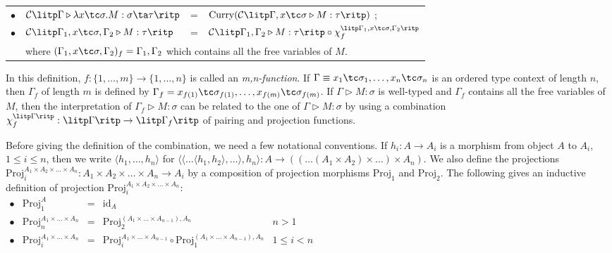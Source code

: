 \begin{definition}
\begin{myitemize}
\begin{tabular}{rlcl}
  $ \bullet $ & $ \mathcal{C} \litp \Gamma \triangleright \lambda x \tc \sigma .M: \sigma \ta \tau \ritp $ & = & $ \text{Curry}( \mathcal{C} \litp \Gamma , x \tc \sigma \triangleright M: \tau \ritp ) $ ; \\[5pt]
  $ \bullet $ & $ \mathcal{C} \litp \Gamma _1 , x \tc \sigma , \Gamma _2 \triangleright M: \tau \ritp $ & = & $ \mathcal{C} \litp \Gamma _1 , \Gamma _2 \triangleright M: \tau \ritp \circ \chi_f^{\litp \Gamma _1 , x \tc \sigma , \Gamma _2 \ritp} $ \\[5pt]
  & \multicolumn{3}{l}{where $ ( \Gamma _1 , x \tc \sigma , \Gamma _2 )_f = \Gamma _1 , \Gamma _2 $ which contains all the free variables of $ M $.} \\[5pt]
  \end{tabular}
\end{myitemize}
\end{definition}

In this definition, $ f: \{ 1, \ldots , m \} \to \{ 1, \ldots , n \} $ is called an \emph{m,n-function}. If $ \Gamma \equiv x_1 \tc \sigma_1, \ldots , x_n \tc \sigma_n $ is an ordered type context of length $ n $, then $ \Gamma_f $ of length $ m $ is defined by $ \Gamma_f = x_{f(1)} \tc \sigma_{f(1)}, \ldots , x_{f(m)} \tc \sigma_{f(m)} $. If $ \Gamma \triangleright M: \sigma $ is well-typed and $ \Gamma_f $ contains all the free variables of $ M $, then the interpretation of $ \Gamma_f \triangleright M: \sigma $ can be related to the one of $ \Gamma \triangleright M: \sigma $ by using a combination $ \chi_f^{\litp \Gamma \ritp} : \litp \Gamma \ritp \to \litp \Gamma_f \ritp $ of pairing and projection functions.

Before giving the definition of the combination, we need a few notational conventions. If $ h_i:A \to A_i $ is a morphism from object $ A $ to $ A_i $, $ 1 \leq i \leq n $, then we write $ \langle h_1, \ldots , h_n \rangle $ for $ \langle \langle \ldots \langle h_1,h_2 \rangle, \ldots \rangle , h_n \rangle : A \to (( \ldots (A_1 \times A_2) \times \ldots ) \times A_n ) $. We also define the projections $ \text{Proj}_i^{A_1 \times A_2 \times \ldots \times A_n} : A_1 \times A_2 \times \ldots \times A_n \to A_i $ by a composition of projection morphisms $ \text{Proj}_1 $ and $ \text{Proj}_2 $. The following gives an inductive definition of projection $ \text{Proj}_i^{A_1 \times A_2 \times \ldots \times A_n} $:\\[5pt]
$
\begin{array}{rlcll}
\bullet & \text{Proj}_1^{A} & = & \text{id}_A & \\[5pt]
\bullet & \text{Proj}_n^{A_1 \times \ldots \times A_n} & = & \text{Proj}_2^{(A_1 \times \ldots \times A_{n-1}), A_n} & n > 1 \\[5pt]
\bullet & \text{Proj}_i^{A_1 \times \ldots \times A_n} & = & \text{Proj}_i^{A_1 \times \ldots \times A_{n-1}} \circ \text{Proj}_1^{(A_1 \times \ldots \times A_{n-1}), A_n} & 1 \leq i < n \\[10pt]
\end{array}
$

